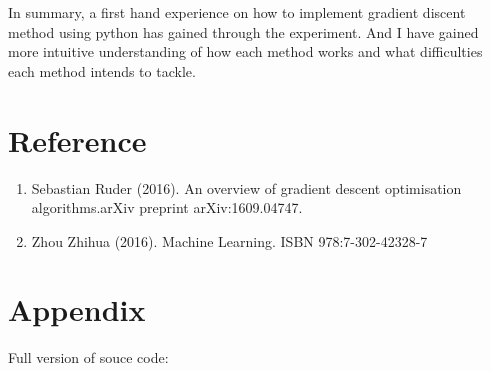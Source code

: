 \documentclass[aps,letterpaper,10pt]{article}
\begin{document}
In summary, a first hand experience on how to implement gradient discent method using python has gained through the experiment. And I have gained more intuitive understanding of how each method works and what difficulties each method intends to tackle.\vspace{8mm}









\newpage
\section{Reference}

\begin{enumerate}
\item Sebastian Ruder (2016). An overview of gradient descent optimisation algorithms.arXiv preprint arXiv:1609.04747.
\item Zhou Zhihua (2016). Machine Learning. ISBN 978:7-302-42328-7
\end{enumerate}

\newpage
\section{Appendix}
Full version of souce code:

\newpage
\listoffigures
\newpage
\listoftables
\end{document}
